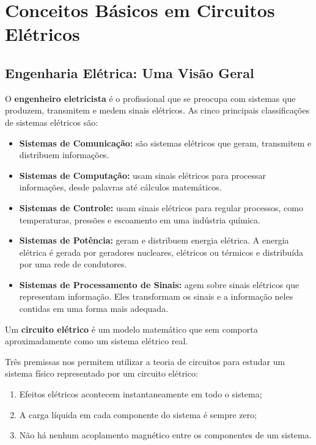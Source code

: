 \chapter{Conceitos Básicos em Circuitos Elétricos}

\section{Engenharia Elétrica: Uma Visão Geral}

O \textbf{engenheiro eletricista} é o profissional que se preocupa com sistemas que produzem, transmitem e medem sinais elétricos. As cinco principais classificações de sistemas elétricos são:
\begin{itemize}
 \item \textbf{Sistemas de Comunicação:} são sistemas elétricos que geram, transmitem e distribuem informações.
 \item \textbf{Sistemas de Computação:} usam sinais elétricos para processar informações, desde palavras até cálculos matemáticos.
 \item \textbf{Sistemas de Controle:} usam sinais elétricos para regular processos, como temperaturas, pressões e escoamento em uma indústria química.
 \item \textbf{Sistemas de Potência:} geram e distribuem energia elétrica. A energia elétrica é gerada por geradores nucleares, elétricos ou térmicos e distribuída por uma rede de condutores.
 \item \textbf{Sistemas de Processamento de Sinais:} agem sobre sinais elétricos que representam informação. Eles transformam os sinais e a informação neles contidas em uma forma mais adequada.
\end{itemize}

\begin{definition}
Um \textbf{circuito elétrico} é um modelo matemático que sem comporta aproximadamente como um sistema elétrico real.
\end{definition}

Três premissas nos permitem utilizar a teoria de circuitos para estudar um sistema físico representado por um circuito elétrico:
\begin{enumerate}
 \item Efeitos elétricos acontecem instantaneamente em todo o sistema;
 \item A carga líquida em cada componente do sistema é sempre zero;
 \item Não há nenhum acoplamento magnético entre os componentes de um sistema.
\end{enumerate}

